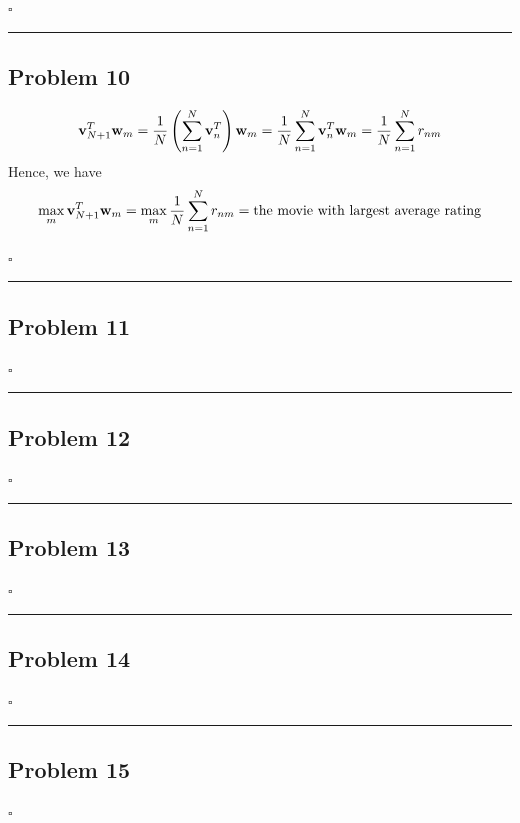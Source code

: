\documentclass[12pt]{article}
\newcommand*{\QEDB}{\hfill\ensuremath{\square}}
\newcommand{\ParTh}[1]{\left(#1\right)}
\newcommand{\BF}[1]{{\bf#1}}
\newcommand{\horrule}[1]{\rule{\linewidth}{#1}}
\begin{document}
\QEDB

\horrule{0.5pt}

\subsection*{Problem 10}

\begin{align}
\BF{v}^T_{N+1}\BF{w}_m=\dfrac{1}{N}\ParTh{\sum_{n=1}^{N}\BF{v}^T_n}\BF{w}_m=\dfrac{1}{N}\sum_{n=1}^{N}\BF{v}^T_n\BF{w}_m=\dfrac{1}{N}\sum_{n=1}^{N}r_{nm}
\end{align}
Hence, we have
\begin{align}
\max_{m}\BF{v}^T_{N+1}\BF{w}_m=\max_{m}\dfrac{1}{N}\sum_{n=1}^{N}r_{nm}=\text{the movie with largest average rating}
\end{align}

\QEDB

\horrule{0.5pt}

\subsection*{Problem 11}



\QEDB

\horrule{0.5pt}

\subsection*{Problem 12}

\QEDB

\horrule{0.5pt}

\subsection*{Problem 13}

\QEDB

\horrule{0.5pt}

\subsection*{Problem 14}

\QEDB

\horrule{0.5pt}

\subsection*{Problem 15}

\QEDB
\end{document}
